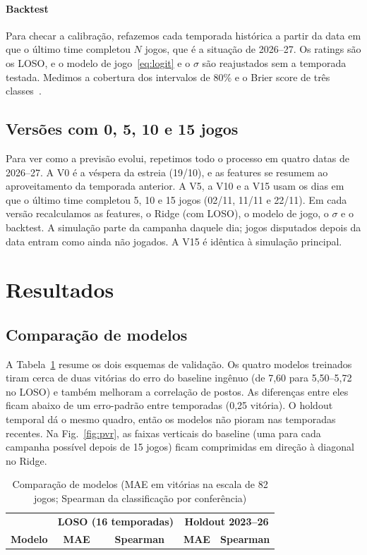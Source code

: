 \documentclass[conference]{IEEEtran}
\begin{document}
\paragraph{Backtest} Para checar a calibração, refazemos cada temporada histórica a partir da data em que o último time completou $N$ jogos, que é a situação de 2026--27. Os ratings são os LOSO, e o modelo de jogo~\eqref{eq:logit} e o $\sigma$ são reajustados sem a temporada testada. Medimos a cobertura dos intervalos de 80\% e o Brier score de três classes~\cite{brier1950}.

\subsection{Versões com 0, 5, 10 e 15 jogos}
Para ver como a previsão evolui, repetimos todo o processo em quatro datas de 2026--27. A V0 é a véspera da estreia (19/10), e as features se resumem ao aproveitamento da temporada anterior. A V5, a V10 e a V15 usam os dias em que o último time completou 5, 10 e 15 jogos (02/11, 11/11 e 22/11). Em cada versão recalculamos as features, o Ridge (com LOSO), o modelo de jogo, o $\sigma$ e o backtest. A simulação parte da campanha daquele dia; jogos disputados depois da data entram como ainda não jogados. A V15 é idêntica à simulação principal.

\section{Resultados}
\subsection{Comparação de modelos}
A Tabela~\ref{tab:models} resume os dois esquemas de validação. Os quatro modelos treinados tiram cerca de duas vitórias do erro do baseline ingênuo (de 7,60 para 5,50--5,72 no LOSO) e também melhoram a correlação de postos. As diferenças entre eles ficam abaixo de um erro-padrão entre temporadas (0,25 vitória). O holdout temporal dá o mesmo quadro, então os modelos não pioram nas temporadas recentes. Na Fig.~\ref{fig:pvr}, as faixas verticais do baseline (uma para cada campanha possível depois de 15 jogos) ficam comprimidas em direção à diagonal no Ridge.

\begin{table}[t]
\caption{Comparação de modelos (MAE em vitórias na escala de 82 jogos; Spearman da classificação por conferência)}
\begin{center}
\begin{tabular}{lcccc}
\toprule
 & \multicolumn{2}{c}{\textbf{LOSO (16 temporadas)}} & \multicolumn{2}{c}{\textbf{Holdout 2023--26}} \\
\textbf{Modelo} & \textbf{MAE} & \textbf{Spearman} & \textbf{MAE} & \textbf{Spearman} \\
\midrule

\bottomrule
\end{tabular}
\label{tab:models}
\end{center}
\end{table}
\end{document}
